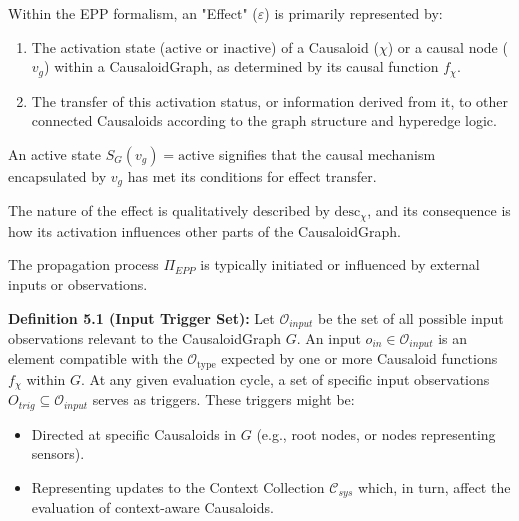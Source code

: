 \begin{definition}
\label{def:epp_effect}       
    Within the EPP formalism, an "Effect" (\(\varepsilon\)) is primarily represented by:
    \begin{enumerate}
        \item The activation state (\(\text{active}\) or \(\text{inactive}\)) of a Causaloid (\(\chi\)) or a causal node (\(v_g\)) within a CausaloidGraph, as determined by its causal function \(f_\chi\).
        \item The transfer of this activation status, or information derived from it, to other connected Causaloids according to the graph structure and hyperedge logic.
    \end{enumerate}
    An active state \(S_G(v_g) = \text{active}\) signifies that the causal mechanism encapsulated by \(v_g\) has met its conditions for effect transfer. 
    \end{definition}
 
 The nature of the effect is qualitatively described by \(\text{desc}_\chi\), and its consequence is how its activation influences other parts of the CausaloidGraph.\newline

    
\begin{definition}
\label{def:epp_input}  
    The propagation process \(\Pi_{EPP}\) is typically initiated or influenced by external inputs or observations.
    
    \textbf{Definition 5.1 (Input Trigger Set):} Let \(\mathcal{O}_{input}\) be the set of all possible input observations relevant to the CausaloidGraph \(G\). An input \(o_{in} \in \mathcal{O}_{input}\) is an element compatible with the \(\mathcal{O}_{\text{type}}\) expected by one or more Causaloid functions \(f_\chi\) within \(G\). 
    At any given evaluation cycle, a set of specific input observations \(O_{trig} \subseteq \mathcal{O}_{input}\) serves as triggers. These triggers might be:
    \begin{itemize}
        \item Directed at specific Causaloids in \(G\) (e.g., root nodes, or nodes representing sensors).
        \item Representing updates to the Context Collection \(\mathcal{C}_{sys}\) which, in turn, affect the evaluation of context-aware Causaloids.
    \end{itemize}
\end{definition}
    

